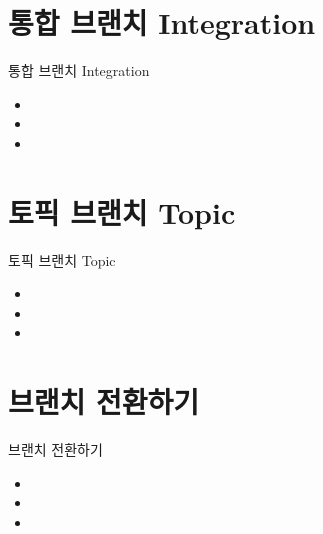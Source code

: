 \documentclass[aspectratio=1610,20pt,xcolor=pdftex,dvipsnames,table,handout]{beamer}
\begin{document}
		\section{통합 브랜치 Integration } 
		\begin{frame} [t,plain]
			\begin{block} {통합 브랜치 Integration } 
			\setlength{\leftmargini}{2em}			
			\begin{itemize}
				\item 
				\item 
				\item 
			\end{itemize}
			\end{block}						
		\end{frame}						

		\section{토픽 브랜치 Topic }
		\begin{frame} [t,plain]
			\begin{block} {토픽 브랜치 Topic }
			\setlength{\leftmargini}{2em}			
			\begin{itemize}
				\item 
				\item 
				\item 
			\end{itemize}
			\end{block}						
		\end{frame}						

		\section{브랜치 전환하기}
		\begin{frame} [t,plain]
			\begin{block} {브랜치 전환하기}
			\setlength{\leftmargini}{2em}			
			\begin{itemize}
				\item 
				\item 
				\item 
			\end{itemize}
			\end{block}						
		\end{frame}						
\end{document}
